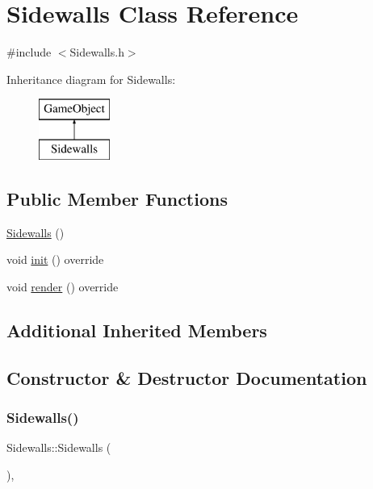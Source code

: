 \hypertarget{class_sidewalls}{}\section{Sidewalls Class Reference}
\label{class_sidewalls}


{\ttfamily \#include $<$Sidewalls.\+h$>$}

Inheritance diagram for Sidewalls\+:\begin{figure}[H]
\begin{center}
\leavevmode
\includegraphics[height=2.000000cm]{class_sidewalls}
\end{center}
\end{figure}
\subsection*{Public Member Functions}
\begin{DoxyCompactItemize}
\item 
\hyperlink{class_sidewalls_aa5ac48e449af6ce0c65d37d452b64d7a}{Sidewalls} ()
\item 
void \hyperlink{class_sidewalls_a4d6161bfb13fe2779a9510c424879707}{init} () override
\item 
void \hyperlink{class_sidewalls_a3459ee5dee7a73043955607c5cb51d73}{render} () override
\end{DoxyCompactItemize}
\subsection*{Additional Inherited Members}


\subsection{Constructor \& Destructor Documentation}
\mbox{\label{class_sidewalls_aa5ac48e449af6ce0c65d37d452b64d7a}} 
\subsubsection{\texorpdfstring{Sidewalls()}{Sidewalls()}}
{\footnotesize\ttfamily Sidewalls\+::\+Sidewalls (\begin{DoxyParamCaption}{ }\end{DoxyParamCaption})\hspace{0.3cm}{\ttfamily [inline]}, {\ttfamily [explicit]}}



